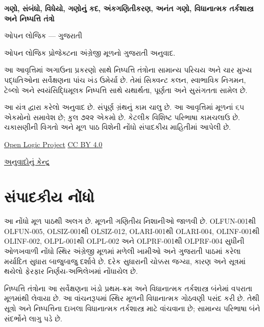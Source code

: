 \renewcommand{\ref}[1]{%
  \ifcsname guexternalref@#1\endcsname
    \csname guexternalref@#1\endcsname
  \else
    \guoriginalref{#1}%
  \fi}
\begin{titlepage}
{\LARGE\bfseries ગણો, સંબંધો, વિધેયો, ગણોનું કદ, અંકગણિતીકરણ,
અનંત ગણો, વિધાનાત્મક તર્કશાસ્ત્ર અને નિષ્પત્તિ તંત્રો\par}
\vspace{1em}
{\Large ઓપન લોજિક — ગુજરાતી\par}
\vspace{2em}
ઓપન લોજિક પ્રોજેક્ટના અંગ્રેજી મૂળનો ગુજરાતી અનુવાદ.\par
\vspace{1em}
આ આવૃત્તિમાં અગાઉના પ્રકરણો સાથે નિષ્પત્તિ તંત્રોના સામાન્ય
પરિચય અને ચાર મુખ્ય પદ્ધતિઓના સર્વેક્ષણના પાંચ ખંડ ઉમેર્યા છે.
તેમાં સિક્વન્ટ કલન, સ્વાભાવિક નિગમન, ટેબ્લો અને સ્વયંસિદ્ધિમૂલક
નિષ્પત્તિ સાથે યથાર્થતા, પૂર્ણતા અને સુસંગતતા સામેલ છે.\par
\vfill
આ યંત્ર દ્વારા કરેલો અનુવાદ છે. સંપૂર્ણ ગ્રંથનું કામ ચાલુ છે.
આ આવૃત્તિમાં મૂળનાં ૬૫ એકમોનો સમાવેશ છે; કુલ ૭૨૨ એકમો છે.
કેટલીક વિશિષ્ટ પરિભાષા કામચલાઉ છે. ચકાસણીની વિગતો અને
મૂળ પાઠ વિશેની નોંધો સંપાદકીય માહિતીમાં આપેલી છે.\par
\vspace{1em}
\href{https://github.com/OpenLogicProject/OpenLogic}{Open Logic Project}
\quad \href{https://creativecommons.org/licenses/by/4.0/}{CC BY 4.0}\par
\href{https://github.com/KokunoYumeto/OpenLogic-translations}{અનુવાદોનું કેન્દ્ર}\par
\end{titlepage}
\tableofcontents
\clearpage

\clearpage
\section*{સંપાદકીય નોંધો}
આ નોંધો મૂળ પાઠથી અલગ છે. મૂળની ગણિતીય નિશાનીઓ જાળવી છે.
OLFUN-001થી OLFUN-005, OLSIZ-001થી OLSIZ-012, OLARI-001થી
OLARI-004, OLINF-001થી OLINF-002, OLPL-001થી OLPL-002 અને
OLPRF-001થી OLPRF-004 સુધીની ઓળખવાળી નોંધો સ્થિર અંગ્રેજી મૂળમાં
મળેલી ખામીઓ અને ગુજરાતી પાઠમાં કરેલા મર્યાદિત સુધારા બાજુબાજુ દર્શાવે
છે. દરેક સુધારાની ચોક્કસ જગ્યા, કારણ અને સૂત્રમાં થયેલો ફેરફાર
નિર્ણય-અભિલેખમાં નોંધાયેલ છે.

નિષ્પત્તિ તંત્રોના આ સર્વેક્ષણના ખંડો પ્રથમ-ક્રમ અને વિધાનાત્મક
તર્કશાસ્ત્ર બંનેમાં વપરાતા મૂળમાંથી લેવાયા છે. આ વાંચનરૂપમાં સ્થિર
મૂળની વિધાનાત્મક ગોઠવણી પસંદ કરી છે. તેથી સૂત્રો અને નિષ્પત્તિના
દાખલા વિધાનાત્મક તર્કશાસ્ત્ર માટે વાંચવાના છે; સામાન્ય પરિભાષા બંને
સંદર્ભોને લાગુ પડે છે.


